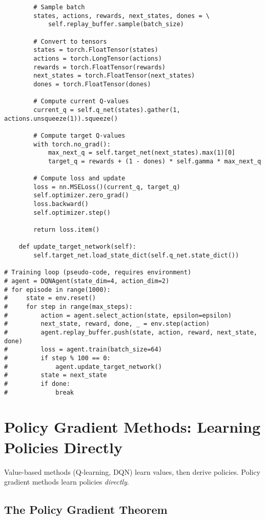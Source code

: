 \begin{codebox}
\begin{lstlisting}
        # Sample batch
        states, actions, rewards, next_states, dones = \
            self.replay_buffer.sample(batch_size)
        
        # Convert to tensors
        states = torch.FloatTensor(states)
        actions = torch.LongTensor(actions)
        rewards = torch.FloatTensor(rewards)
        next_states = torch.FloatTensor(next_states)
        dones = torch.FloatTensor(dones)
        
        # Compute current Q-values
        current_q = self.q_net(states).gather(1, actions.unsqueeze(1)).squeeze()
        
        # Compute target Q-values
        with torch.no_grad():
            max_next_q = self.target_net(next_states).max(1)[0]
            target_q = rewards + (1 - dones) * self.gamma * max_next_q
        
        # Compute loss and update
        loss = nn.MSELoss()(current_q, target_q)
        self.optimizer.zero_grad()
        loss.backward()
        self.optimizer.step()
        
        return loss.item()
    
    def update_target_network(self):
        self.target_net.load_state_dict(self.q_net.state_dict())

# Training loop (pseudo-code, requires environment)
# agent = DQNAgent(state_dim=4, action_dim=2)
# for episode in range(1000):
#     state = env.reset()
#     for step in range(max_steps):
#         action = agent.select_action(state, epsilon=epsilon)
#         next_state, reward, done, _ = env.step(action)
#         agent.replay_buffer.push(state, action, reward, next_state, done)
#         loss = agent.train(batch_size=64)
#         if step % 100 == 0:
#             agent.update_target_network()
#         state = next_state
#         if done:
#             break
\end{lstlisting}
\end{codebox}

\section{Policy Gradient Methods: Learning Policies Directly}

Value-based methods (Q-learning, DQN) learn values, then derive policies. Policy gradient methods learn policies \textit{directly}.

\subsection{The Policy Gradient Theorem}

